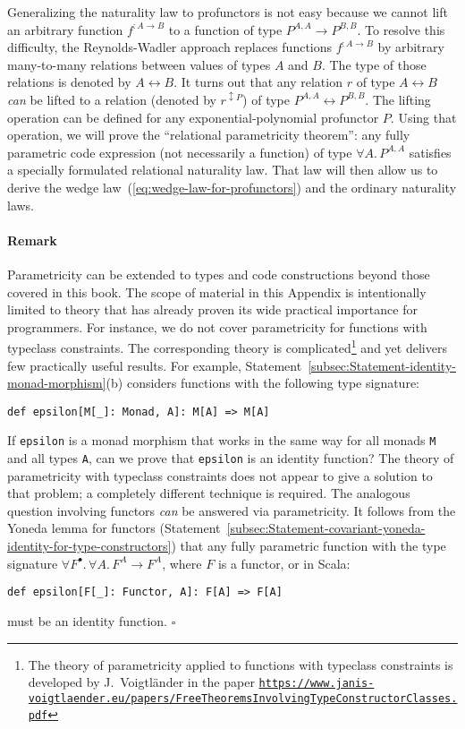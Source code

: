 Generalizing the naturality law to profunctors is not easy because
we cannot lift an arbitrary function $f^{:A\rightarrow B}$ to a function
of type $P^{A,A}\rightarrow P^{B,B}$. To resolve this difficulty,
the Reynolds-Wadler approach replaces functions $f^{:A\rightarrow B}$
by arbitrary many-to-many relations between values of types $A$ and
$B$. The type of those relations is denoted by $A\leftrightarrow B$.
It turns out that any relation $r$ of type $A\leftrightarrow B$
\emph{can} be lifted to a relation (denoted by $r^{\updownarrow P}$)
of type $P^{A,A}\leftrightarrow P^{B,B}$. The lifting operation can
be defined for any exponential-polynomial profunctor $P$. Using that
operation, we will prove the \textsf{``}relational parametricity theorem\textsf{''}:
any fully parametric code expression (not necessarily a function)
of type $\forall A.\,P^{A,A}$ satisfies a specially formulated relational
naturality law. That law will then allow us to derive the wedge law~(\ref{eq:wedge-law-for-profunctors})
and the ordinary naturality laws.

\paragraph{Remark}

Parametricity can be extended to types and code constructions beyond
those covered in this book. The scope of material in this Appendix
is intentionally limited to theory that has already proven its wide
practical importance for programmers. For instance, we do not cover
parametricity for functions with typeclass constraints. The corresponding
theory is complicated\footnote{The theory of parametricity applied to functions with typeclass constraints
is developed by J.~Voigtl\"ander
in the paper \texttt{\href{https://www.janis-voigtlaender.eu/papers/FreeTheoremsInvolvingTypeConstructorClasses.pdf}{https://www.janis-voigtlaender.eu/papers/FreeTheoremsInvolvingTypeConstructorClasses.pdf}}} and yet delivers few practically useful results. For example, Statement~\ref{subsec:Statement-identity-monad-morphism}(b)
considers functions with the following type signature:
\begin{lstlisting}
def epsilon[M[_]: Monad, A]: M[A] => M[A]
\end{lstlisting}
If \lstinline!epsilon! is a monad morphism that works in the same
way for all monads \lstinline!M! and all types \lstinline!A!, can
we prove that \lstinline!epsilon! is an identity function? The theory
of parametricity with typeclass constraints does not appear to give
a solution to that problem; a completely different technique is required.
The analogous question involving functors \emph{can} be answered via
parametricity. It follows from the Yoneda lemma for functors (Statement~\ref{subsec:Statement-covariant-yoneda-identity-for-type-constructors})
that any fully parametric function with the type signature $\forall F^{\bullet}.\,\forall A.\,F^{A}\rightarrow F^{A}$,
where $F$ is a functor, or in Scala:
\begin{lstlisting}
def epsilon[F[_]: Functor, A]: F[A] => F[A]
\end{lstlisting}
must be an identity function. $\square$


